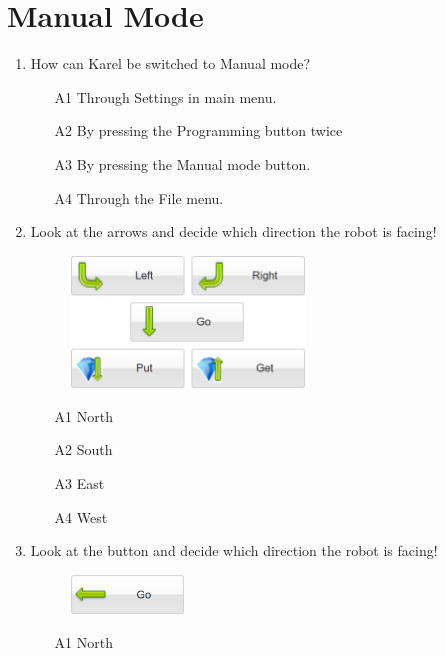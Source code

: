 \section{Manual Mode}

\begin{enumerate}
\item How can Karel be switched to Manual mode?
\begin{enumerate}
\item[A1] Through Settings in main menu.
\item[A2] By pressing the Programming button twice
\item[A3] By pressing the Manual mode button.
\item[A4] Through the File menu.
\end{enumerate}
\item Look at the arrows and decide which direction the robot is facing!
\newpage
\begin{figure}[!ht]
\begin{center}
\includegraphics[width=6.2cm]{img/buttons-all-3.png}
\vspace{-6mm}
\end{center}
\end{figure}
\begin{enumerate}
\item[A1] North
\item[A2] South
\item[A3] East
\item[A4] West
\end{enumerate}  
\item Look at the button and decide which direction the robot is facing!
\begin{figure}[!ht]
\begin{center}
\includegraphics[width=3cm]{img/button-go-3.png}
\end{center}
\end{figure}
\begin{enumerate}
\item[A1] North

\end{enumerate}
\end{enumerate}
